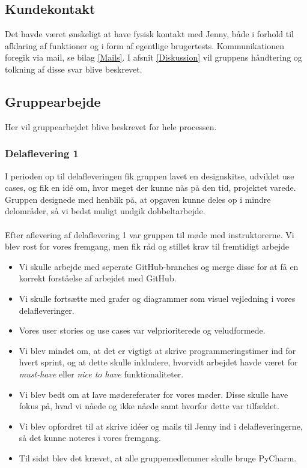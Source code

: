 \documentclass[]{article}
\begin{document}
\subsection{Kundekontakt}
Det havde været ønskeligt at have fysisk kontakt med Jenny, både i forhold til afklaring af funktioner og i form af egentlige brugertests. Kommunikationen foregik via mail, se bilag \ref{Mails}. I afsnit \ref{Diskussion} %
vil gruppens håndtering og tolkning af disse svar blive beskrevet. %


\subsection{Gruppearbejde}
Her vil gruppearbejdet blive beskrevet for hele processen.

\subsubsection{Delaflevering 1}
\noindent I perioden op til delafleveringen fik gruppen lavet en designskitse, udviklet use cases, og fik en idé om, hvor meget der kunne nås på den tid, projektet varede. Gruppen designede med henblik på, at opgaven kunne deles op i mindre delområder, så vi bedst muligt undgik dobbeltarbejde. \\ \\
Efter aflevering af delaflevering 1 var gruppen til møde med instruktorerne. Vi blev rost for vores fremgang, men fik råd og stillet krav til fremtidigt arbejde
\begin{itemize}
    \item Vi skulle arbejde med seperate GitHub-branches og merge disse for at få en korrekt forståelse af arbejdet med GitHub.
    \item Vi skulle fortsætte med grafer og diagrammer som visuel vejledning i vores delafleveringer.
    \item Vores user stories og use cases var velprioriterede og veludformede.
    \item Vi blev mindet om, at det er vigtigt at skrive programmeringstimer ind for hvert sprint, og at dette skulle inkludere, hvorvidt arbejdet havde været for \textit{must-have} eller \textit{nice to have} funktionaliteter.
    \item Vi blev bedt om at lave mødereferater for vores møder. Disse skulle have fokus på, hvad vi nåede og ikke nåede samt hvorfor dette var tilfældet.
    \item Vi blev opfordret til at skrive idéer og mails til Jenny ind i delafleveringerne, så det kunne noteres i vores fremgang. 
    \item Til sidst blev det krævet, at alle gruppemedlemmer skulle bruge PyCharm.
\end{itemize}
\end{document}
